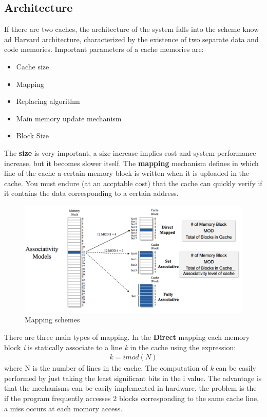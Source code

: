 \documentclass[12pt]{article}
\begin{document}
\subsection{Architecture}
If there are two caches, the architecture of the system falls into the scheme know ad Harvard architecture, characterized by the existence of two separate data and code memories. Important parameters of a cache memories are:
\begin{itemize}
  \item Cache size
  \item Mapping
  \item Replacing algorithm
  \item Main memory update mechanism
  \item Block Size
\end{itemize}
The \textbf{size} is very important, a size increase implies cost and system performance increase, but it becomes slower itself. The \textbf{mapping} mechanism defines in which line of the cache a certain memory block is written when it is uploaded in the cache. You must endure (at an accptable cost) that the cache can quickly verify if it contains the data corresponding to a certain address.
\begin{figure}[h!]
  \includegraphics[width=\linewidth]{images/mapping.png}
  \caption{Mapping schemes}
  \label{fig:mapping}
\end{figure}
There are three main types of mapping. In the \textbf{Direct} mapping each memory block \textit{i} is statically associate to a line \textit{k} in the cache using the expression:
\begin{equation}
  \begin{gathered}
    k = i mod(N)
  \end{gathered}
\end{equation}
where N is the number of lines in the cache. The computation of \textit{k} can be easily performed by just taking the least significant bits in the i value. The advantage is that the mechanisms can be easily implemented in hardware, the problem is the if the program frequently accesses 2 blocks corresponding to the same cache line, a miss occurs at each momory access.\\
\end{document}
